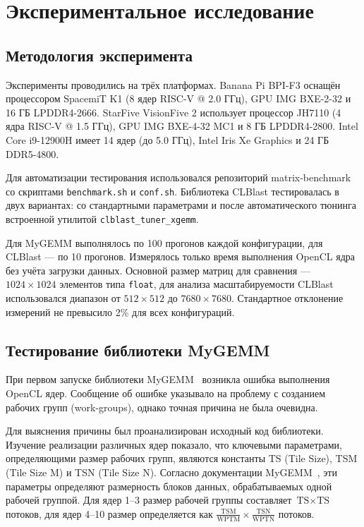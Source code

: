 
\section{Экспериментальное исследование}

\subsection{Методология эксперимента}

Эксперименты проводились на трёх платформах. Banana Pi BPI-F3 оснащён процессором SpacemiT K1 (8 ядер RISC-V @ 2.0 ГГц), GPU IMG BXE-2-32 и 16 ГБ LPDDR4-2666. StarFive VisionFive 2 использует процессор JH7110 (4 ядра RISC-V @ 1.5 ГГц), GPU IMG BXE-4-32 MC1 и 8 ГБ LPDDR4-2800. Intel Core i9-12900H имеет 14 ядер (до 5.0 ГГц), Intel Iris Xe Graphics и 24 ГБ DDR5-4800.

Для автоматизации тестирования использовался репозиторий matrix-benchmark~\cite{matrix_benchmark_repo} со скриптами \texttt{benchmark.sh} и \texttt{conf.sh}. Библиотека CLBlast тестировалась в двух вариантах: со стандартными параметрами и после автоматического тюнинга встроенной утилитой \texttt{clblast\_tuner\_xgemm}.

Для MyGEMM выполнялось по 100 прогонов каждой конфигурации, для CLBlast --- по 10 прогонов. Измерялось только время выполнения OpenCL ядра без учёта загрузки данных. Основной размер матриц для сравнения --- $1024 \times 1024$ элементов типа \texttt{float}, для анализа масштабируемости CLBlast использовался диапазон от $512 \times 512$ до $7680 \times 7680$. Стандартное отклонение измерений не превысило 2\% для всех конфигураций.

\subsection{Тестирование библиотеки MyGEMM}

При первом запуске библиотеки MyGEMM~\cite{mygemm_repo} возникла ошибка выполнения OpenCL ядер. Сообщение об ошибке указывало на проблему с созданием рабочих групп (work-groups), однако точная причина не была очевидна.

Для выяснения причины был проанализирован исходный код библиотеки. Изучение реализации различных ядер показало, что ключевыми параметрами, определяющими размер рабочих групп, являются константы TS (Tile Size), TSM (Tile Size M) и TSN (Tile Size N). Согласно документации MyGEMM~\cite{nugteren2018mygemm}, эти параметры определяют размерность блоков данных, обрабатываемых одной рабочей группой. Для ядер 1--3 размер рабочей группы составляет $\text{TS} \times \text{TS}$ потоков, для ядер 4--10 размер определяется как $\frac{\text{TSM}}{\text{WPTM}} \times \frac{\text{TSN}}{\text{WPTN}}$ потоков.

